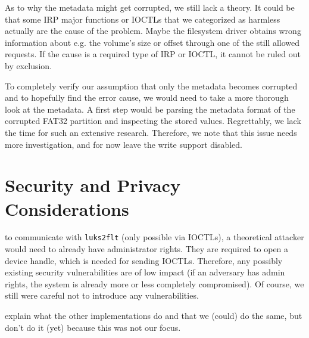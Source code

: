 As to why the metadata might get corrupted, we still lack a theory. It could be that some IRP major functions or IOCTLs that we categorized as harmless actually are the cause of the problem. Maybe the filesystem driver obtains wrong information about e.g. the volume's size or offset through one of the still allowed requests. If the cause is a required type of IRP or IOCTL, it cannot be ruled out by exclusion.

To completely verify our assumption that only the metadata becomes corrupted and to hopefully find the error cause, we would need to take a more thorough look at the metadata. A first step would be parsing the metadata format of the corrupted FAT32 partition and inspecting the stored values. Regrettably, we lack the time for such an extensive research. Therefore, we note that this issue needs more investigation, and for now leave the write support disabled.

\section{Security and Privacy Considerations}
\label{chap:ourapproach.security}

 to communicate with \texttt{luks2flt} (only possible via IOCTLs), a theoretical attacker would need to already have administrator rights. They are required to open a device handle, which is needed for sending IOCTLs. Therefore, any possibly existing security vulnerabilities are of low impact (if an adversary has admin rights, the system is already more or less completely compromised). Of course, we still were careful not to introduce any vulnerabilities.

 explain what the other implementations do and that we (could) do the same, but don't do it (yet) because this was not our focus.





